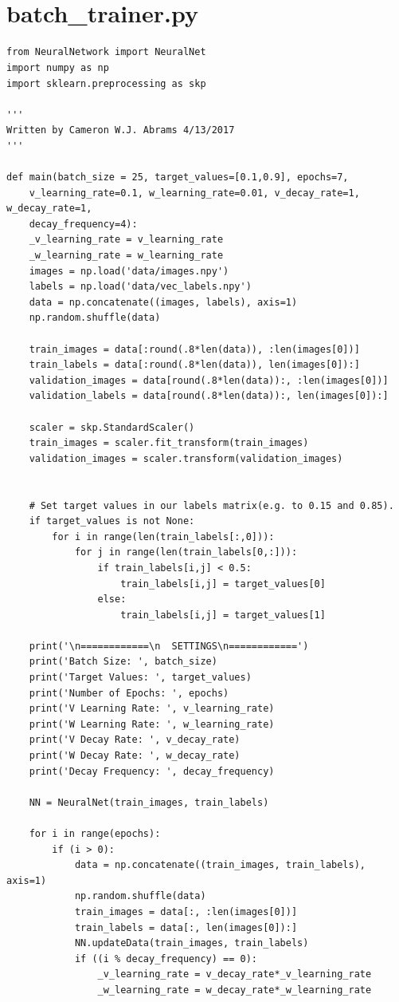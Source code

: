 \documentclass[12pt]{article}
\begin{document}
\section{\\batch\_trainer.py}
\begin{verbatim}
from NeuralNetwork import NeuralNet
import numpy as np
import sklearn.preprocessing as skp

'''
Written by Cameron W.J. Abrams 4/13/2017
'''

def main(batch_size = 25, target_values=[0.1,0.9], epochs=7,
	v_learning_rate=0.1, w_learning_rate=0.01, v_decay_rate=1, w_decay_rate=1,
	decay_frequency=4):
	_v_learning_rate = v_learning_rate
	_w_learning_rate = w_learning_rate
	images = np.load('data/images.npy')
	labels = np.load('data/vec_labels.npy')
	data = np.concatenate((images, labels), axis=1)
	np.random.shuffle(data)
	
	train_images = data[:round(.8*len(data)), :len(images[0])]
	train_labels = data[:round(.8*len(data)), len(images[0]):]
	validation_images = data[round(.8*len(data)):, :len(images[0])]
	validation_labels = data[round(.8*len(data)):, len(images[0]):]

	scaler = skp.StandardScaler()
	train_images = scaler.fit_transform(train_images)
	validation_images = scaler.transform(validation_images)
	

	# Set target values in our labels matrix(e.g. to 0.15 and 0.85).
	if target_values is not None:
		for i in range(len(train_labels[:,0])):
			for j in range(len(train_labels[0,:])):
				if train_labels[i,j] < 0.5:
					train_labels[i,j] = target_values[0]
				else:
					train_labels[i,j] = target_values[1]

	print('\n============\n  SETTINGS\n============')
	print('Batch Size: ', batch_size)
	print('Target Values: ', target_values)
	print('Number of Epochs: ', epochs)
	print('V Learning Rate: ', v_learning_rate)
	print('W Learning Rate: ', w_learning_rate)
	print('V Decay Rate: ', v_decay_rate)
	print('W Decay Rate: ', w_decay_rate)
	print('Decay Frequency: ', decay_frequency)

	NN = NeuralNet(train_images, train_labels)

	for i in range(epochs):
		if (i > 0):
			data = np.concatenate((train_images, train_labels), axis=1)
			np.random.shuffle(data)
			train_images = data[:, :len(images[0])]
			train_labels = data[:, len(images[0]):]
			NN.updateData(train_images, train_labels)
			if ((i % decay_frequency) == 0):
				_v_learning_rate = v_decay_rate*_v_learning_rate
				_w_learning_rate = w_decay_rate*_w_learning_rate


\end{verbatim}
\end{document}
